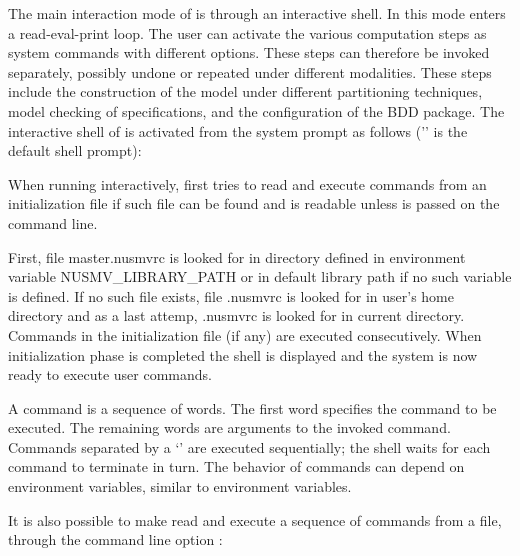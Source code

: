 
The main interaction mode of \nusmv is through an interactive shell.
In this mode \nusmv enters a read-eval-print loop. The user can
activate the various \nusmv computation steps as system commands with
different options. These steps can therefore be invoked separately,
possibly undone or repeated under different modalities. These steps
include the construction of the model under different partitioning
techniques, model checking of specifications, and the configuration of
the BDD package. The interactive shell of \nusmv is activated from the
system prompt as follows ('\nusmvprompt' is the default \nusmv
shell prompt):

\begin{alltt}
\shellprompt {} \ret
\nusmvprompt
\end{alltt}

When running interactively, \nusmv first tries to read and execute
commands from an initialization file if such file can be found and is
readable unless  is passed on the command line.

First, file master.nusmvrc is looked for in directory defined in
environment variable NUSMV\_LIBRARY\_PATH or in default library path
if no such variable is defined. If no such file exists, file .nusmvrc
is looked for in user's home directory and as a last attemp, .nusmvrc
is looked for in current directory. Commands in the initialization
file (if any) are executed consecutively. When initialization phase is
completed the \nusmv shell is displayed and the system is now ready to
execute user commands.

A \nusmv command is a sequence of words. The first word specifies the
command to be executed. The remaining words are arguments to the
invoked command. Commands separated by a `\code{;}' are executed
sequentially; the \nusmv shell waits for each command to terminate in
turn. The behavior of commands can depend on environment variables,
similar to \csh environment variables.

It is also possible to make \nusmv read and execute a sequence of
commands from a file, through the command line option
:

\begin{alltt}
\shellprompt {} \ret
\end{alltt}

\begin{nusmvTable}

\end{nusmvTable}

